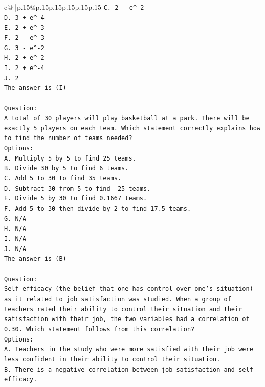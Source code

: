 \documentclass{article}
\begin{document}
{\begin{supertabular}{c@{$\;$}|p{.15\linewidth}@{}p{.15\linewidth}p{.15\linewidth}p{.15\linewidth}p{.15\linewidth}p{.15\linewidth}}
{{{\texttt{C. 2 {-} e\^{}{-}2} \\
\texttt{D. 3 + e\^{}{-}4} \\
\texttt{E. 2 + e\^{}{-}3} \\
\texttt{F. 2 {-} e\^{}{-}3} \\
\texttt{G. 3 {-} e\^{}{-}2} \\
\texttt{H. 2 + e\^{}{-}2} \\
\texttt{I. 2 + e\^{}{-}4} \\
\texttt{J. 2} \\
\texttt{The answer is (I)} \\
\\ 
\texttt{Question:} \\
\texttt{A total of 30 players will play basketball at a park. There will be exactly 5 players on each team. Which statement correctly explains how to find the number of teams needed?} \\
\texttt{Options:} \\
\texttt{A. Multiply 5 by 5 to find 25 teams.} \\
\texttt{B. Divide 30 by 5 to find 6 teams.} \\
\texttt{C. Add 5 to 30 to find 35 teams.} \\
\texttt{D. Subtract 30 from 5 to find {-}25 teams.} \\
\texttt{E. Divide 5 by 30 to find 0.1667 teams.} \\
\texttt{F. Add 5 to 30 then divide by 2 to find 17.5 teams.} \\
\texttt{G. N/A} \\
\texttt{H. N/A} \\
\texttt{I. N/A} \\
\texttt{J. N/A} \\
\texttt{The answer is (B)} \\
\\ 
\texttt{Question:} \\
\texttt{Self{-}efficacy (the belief that one has control over one's situation) as it related to job satisfaction was studied. When a group of teachers rated their ability to control their situation and their satisfaction with their job, the two variables had a correlation of 0.30. Which statement follows from this correlation?} \\
\texttt{Options:} \\
\texttt{A. Teachers in the study who were more satisfied with their job were less confident in their ability to control their situation.} \\
\texttt{B. There is a negative correlation between job satisfaction and self{-}efficacy.} \\
}}}
\end{supertabular}}
\end{document}
